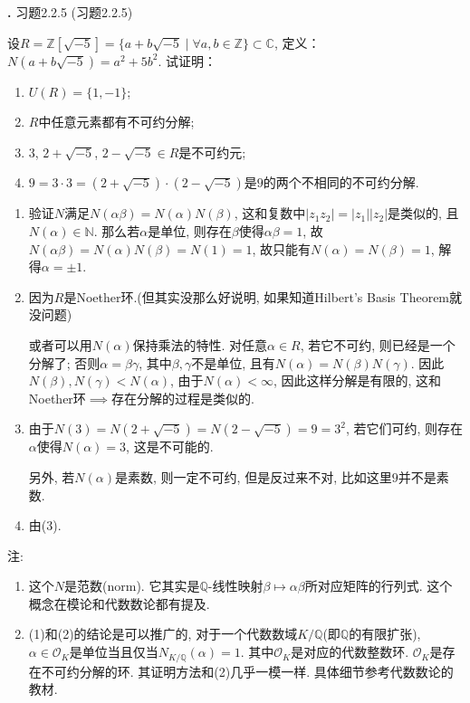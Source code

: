 \documentclass[UTF8,fontset=windows]{ctexart}
\newcounter{problem}
\newenvironment{problem}[1][]
{
    \refstepcounter{problem}
    \noindent\textbf{\theproblem.}
    \ifx\relax#1\relax
    \else
        (#1)
    \fi
    \par\vspace{0.5em}
}
{\vspace{1em}}
\newenvironment{solution}
{\begin{tcolorbox}[colback=blue!10, colframe=blue!50, title=\textit{proof}, breakable]}
{\end{tcolorbox}}
\begin{document}
\begin{problem}[习题2.2.5]
    设$R = \mathbb{Z}[\sqrt{-5}] = \{a + b\sqrt{-5} \mid \forall a, b \in\mathbb{Z}\} \subset \mathbb{C}$,
定义：$N(a + b\sqrt{-5}) = a^2 + 5b^2$. 试证明：
\begin{enumerate}[(1)]
    \item $U(R) = \{1, -1\}$;
    \item $R$中任意元素都有不可约分解;
    \item $3$, $2 + \sqrt{-5}$, $2 - \sqrt{-5} \in R$是不可约元;
    \item $9 = 3 \cdot 3= (2 + \sqrt{-5}) \cdot (2 - \sqrt{-5})$是$9$的两个不相同的不可约分解.
\end{enumerate}
\end{problem}

\begin{solution}
\begin{enumerate}[(1)]
    \item 验证$N$满足$N(\alpha\beta) = N(\alpha)N(\beta)$, 这和复数中$|z_1z_2| = |z_1||z_2|$是类似的, 且$N(\alpha) \in \mathbb{N}$. 那么若$\alpha$是单位, 则存在$\beta$使得$\alpha\beta = 1$, 故$N(\alpha\beta) = N(\alpha)N(\beta) = N(1) = 1$, 故只能有$N(\alpha) = N(\beta) = 1$, 解得$\alpha = \pm 1$.
    \item 因为$R$是Noether环.(但其实没那么好说明, 如果知道Hilbert's Basis Theorem就没问题)
    
    或者可以用$N(\alpha)$保持乘法的特性. 对任意$\alpha \in R$, 若它不可约, 则已经是一个分解了; 否则$\alpha = \beta\gamma$, 其中$\beta, \gamma$不是单位, 且有$N(\alpha) = N(\beta)N(\gamma)$. 因此$N(\beta), N(\gamma) < N(\alpha)$, 由于$N(\alpha) < \infty$, 因此这样分解是有限的, 这和Noether环$\implies$存在分解的过程是类似的.
    \item 由于$N(3) = N(2 + \sqrt{-5}) = N(2 - \sqrt{-5}) = 9 = 3^2$, 若它们可约, 则存在$\alpha$使得$N(\alpha) = 3$, 这是不可能的.
    
    另外, 若$N(\alpha)$是素数, 则一定不可约, 但是反过来不对, 比如这里$9$并不是素数.
    \item 由(3).
\end{enumerate}
注: 
\begin{enumerate}[1.]
    \item 这个$N$是范数(norm). 它其实是$\mathbb{Q}$-线性映射$\beta \mapsto \alpha\beta$所对应矩阵的行列式. 这个概念在模论和代数数论都有提及.
    \item (1)和(2)的结论是可以推广的, 对于一个代数数域$K/\mathbb{Q}$(即$\mathbb{Q}$的有限扩张), $\alpha \in \mathcal{O}_K$是单位当且仅当$N_{K/\mathbb{Q}}(\alpha) = 1$. 其中$\mathcal{O}_K$是对应的代数整数环. $\mathcal{O}_K$是存在不可约分解的环. 其证明方法和(2)几乎一模一样. 具体细节参考代数数论的教材.
\end{enumerate}
\end{solution}
\end{document}
